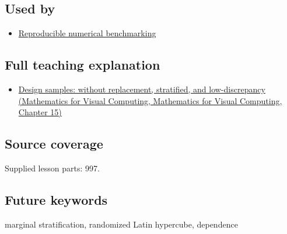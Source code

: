 \subsection{Used by}\label{appendix-1c5e85693a06-used-by}

\begin{itemize}
\tightlist
\item
  \hyperref[appendix-b9db93e28371]{Reproducible numerical benchmarking}
\end{itemize}

\subsection{Full teaching explanation}\label{appendix-1c5e85693a06-full-teaching-explanation}

\begin{itemize}
\tightlist
\item
  \href{../02-Mathematics-for-Visual-Computing/main.pdf\#nameddest=02-foundations-ii-ch031-design-samples-without-replacement-stratified-and-low-discrepancy}{Design samples: without replacement, stratified, and low-discrepancy (Mathematics for Visual Computing, Mathematics for Visual Computing, Chapter 15)}
\end{itemize}

\subsection{Source coverage}\label{appendix-1c5e85693a06-source-coverage}

Supplied lesson parts: 997.

\subsection{Future keywords}\label{appendix-1c5e85693a06-future-keywords}

marginal stratification, randomized Latin hypercube, dependence
